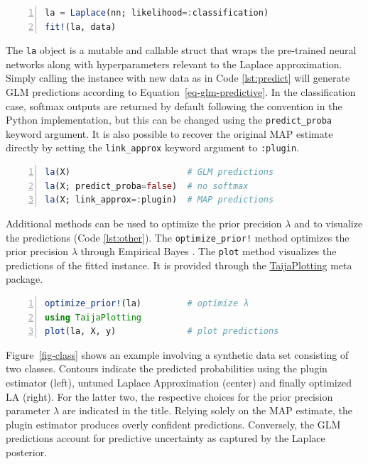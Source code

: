 \documentclass{juliacon}
\begin{document}
\begin{lstlisting}[language=Julia, escapechar=@, numbers=left, label={lst:fit}, caption={Fitting a pre-trained neural network to data using Laplace Redux.}]
la = Laplace(nn; likelihood=:classification)
fit!(la, data)
\end{lstlisting}

The \texttt{la} object is a mutable and callable struct that wraps the
pre-trained neural networks along with hyperparameters relevant to the
Laplace approximation. Simply calling the instance with new data as in
Code \ref{lst:predict} will generate GLM predictions according to
Equation~\ref{eq-glm-predictive}. In the classification case, softmax
outputs are returned by default following the convention in the Python
implementation, but this can be changed using the
\texttt{predict\_proba} keyword argument. It is also possible to recover
the original MAP estimate directly by setting the \texttt{link\_approx}
keyword argument to \texttt{:plugin}.

\begin{lstlisting}[language=Julia, escapechar=@, numbers=left, label={lst:predict}, caption={Predictions using the fitted Laplace Redux instance.}]
la(X)                       # GLM predictions
la(X; predict_proba=false)  # no softmax
la(X; link_approx=:plugin)  # MAP predictions
\end{lstlisting}

Additional methods can be used to optimize the prior precision
\(\lambda\) and to visualize the predictions (Code \ref{lst:other}). The
\texttt{optimize\_prior!} method optimizes the prior precision
\(\lambda\) through Empirical Bayes \cite{daxberger2021laplace}. The
\texttt{plot} method visualizes the predictions of the fitted instance.
It is provided through the
\href{https://github.com/JuliaTrustworthyAI/TaijaPlotting.jl}{TaijaPlotting}
meta package.

\begin{lstlisting}[language=Julia, escapechar=@, numbers=left, label={lst:other}, caption={Prior optimization and visualization of the predictive distribution.}]
optimize_prior!(la)         # optimize λ
using TaijaPlotting
plot(la, X, y)              # plot predictions
\end{lstlisting}

Figure~\ref{fig-class} shows an example involving a synthetic data set
consisting of two classes. Contours indicate the predicted probabilities
using the plugin estimator (left), untuned Laplace Approximation
(center) and finally optimized LA (right). For the latter two, the
respective choices for the prior precision parameter \(\lambda\) are
indicated in the title. Relying solely on the MAP estimate, the plugin
estimator produces overly confident predictions. Conversely, the GLM
predictions account for predictive uncertainty as captured by the
Laplace posterior.
\end{document}
